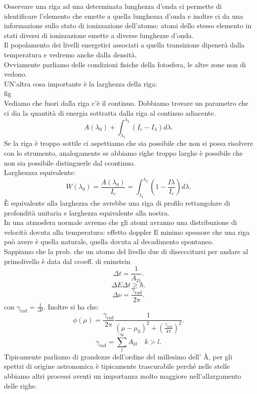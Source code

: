 Osservare una riga ad una determinata lunghezza d'onda ci permette di identificare l'elemento che emette a quella lunghezza d'onda e inoltre ci da una informazione sullo stato di ionizzazione dell'atomo: atomi dello stesso elemento in stati diversi di ionizzazione emette a diverse lunghezze d'onda. \\
Il popolamento dei livelli energetici associati a quella transizione dipenerà dalla temperatura e vedremo anche dalla densità.\\
Ovviamente parliamo delle condizioni fisiche della fotosfera, le altre zone non di vedono. \\
UN'altra cosa importante è la larghezza della riga:\\
fig\\
Vediamo che fuori dalla riga c'è il continuo. Dobbiamo trovare un parametro che ci dia la quantità di energia sottratta dalla riga al continuo adiacente.
\[
	A( \lambda_0) + \int_{\lambda_1}^{\lambda_2} \left( I_{c}-I_{\lambda } \right) d\lambda  
.\] 
Se la riga è troppo sottile ci aspettiamo che sia possibile che non si possa risolvere con lo strumento, analogamente se abbiamo righe troppo larghe è possibile che non sia possibile distinguerle dal ccontinuo.\\
Larghezzza equivalente:
\[
	W( \lambda_0) = \frac{A( \lambda_0) }{I_{c}}= 
	\int_{\lambda_1}^{\lambda_2} \left( 1 - \frac{I\lambda }{I_{c}}\right)d\lambda 
.\] 
È equivalente alla larghezza che avrebbe una riga di profilo rettangolare di profondità unitaria e larghezza equivalente alla nostra.\\
In una atmosfera normale avremo che gli atomi avranno una distribuzione di velocità dovuta alla temperatura: effetto doppler
Il minimo spessore che una riga può avere è quella naturale, quella dovuta al decadimento spontaneo.\\
Sappiamo che la prob. che un atomo del livello due di disecccitarsi per andare al primolivello è data dal ccoeff. di eninstein
\[
	\Delta t = \frac{1}{A_{21}} 
.\] 
\[
	\Delta E\Delta t \ge \hbar
.\] 
\[
	\Delta \nu = \frac{\gamma _{\text{rad}}}{2\pi}
.\] 
con $\gamma _{\text{rad}}= \frac{1}{\Delta t}$. Inoltre si ha che:
\[
	\phi ( \mu ) = \frac{\gamma _{\text{rad}}}{2\pi}\frac{1}{\left( \mu -\mu_0 \right) ^2 + \left( \frac{\gamma _{\text{rad}}}{4\pi} \right) ^2}
.\] 
\[
	\gamma _{\text{rad}} = \sum_{l}^{\infty} A_{kl} \quad k > l
.\] 
Tipicamente parliamo di grandezze dell'ordine del millesimo dell' \AA , per gli spettri di origine astronomica è tipicamente trascurabile perché nelle stelle abbiamo altri processi aventi un importanza molto maggiore nell'allargamento delle righe. \\
